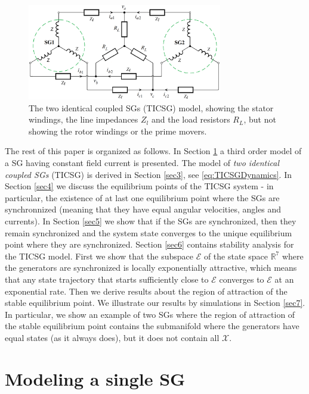 \documentclass[letterpaper,10pt,conference]{ieeeconf}
\newcommand{\rline}  {{\mathbb R}}
\newcommand{\Emscr}  {{\mathcal{E}}}
\newcommand{\Xmscr}  {{\mathcal{X}}}
\begin{document}
\begin{figure} %
\centering \includegraphics[width=8.5cm]{full_circuit_with_2_SGs}
\caption{The two identical coupled SGs (TICSG) model, showing the 
stator windings, the line impedances $Z_l$ and the load resistors 
$R_L$, but not showing the rotor windings or the prime movers.}
\label{fig:TICSGThreePhase}
\end{figure}

The rest of this paper is organized as follows. In Section \ref{sec2}
a third order model of a SG having constant field current is
presented. The model of {\em two identical coupled SGs} (TICSG) is
derived in Section \ref{sec3}, see \eqref{eq:TICSGDynamics}. In
Section \ref{sec4} we discuss the equilibrium points of the TICSG
system - in particular, the existence of at last one equilibrium point
where the SGs are synchronnized (meaning that they have equal angular
velocities, angles and currents). In Section \ref{sec5} we show that
if the SGs are synchronized, then they remain synchronized and the
system state converges to the unique equilibrium point where they are
synchronized. Section \ref{sec6} contains stability analysis for the
TICSG model. First we show that the subspace $\Emscr$ of the state
space $\rline^7$ where the generators are synchronized is locally
exponentially attractive, which means that any state trajectory that
starts sufficiently close to $\Emscr$ converges to $\Emscr$ at an
exponential rate. Then we derive results about the region of
attraction of the stable equilibrium point. We illustrate our results
by simulations in Section \ref{sec7}. In particular, we show an
example of two SGs where the region of attraction of the stable
equilibrium point contains the submanifold where the generators have
equal states (as it always does), but it does not contain all
$\Xmscr$.

\section{Modeling a single SG} \label{sec2} %
\end{document}
